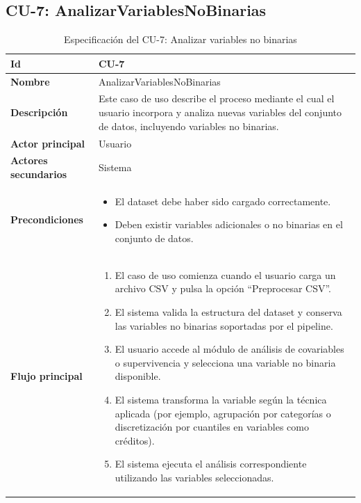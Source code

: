     \subsection{CU-7: AnalizarVariablesNoBinarias}
\begin{longtable}{|p{4cm}|p{10cm}|}
\caption{Especificación del CU-7: Analizar variables no binarias}
\label{tab:esp_cu7}\\
\hline
\textbf{Id} & CU-7 \\ \hline
\textbf{Nombre} & AnalizarVariablesNoBinarias \\ \hline

\textbf{Descripción} & 
Este caso de uso describe el proceso mediante el cual el usuario incorpora y analiza nuevas variables del conjunto de datos, incluyendo variables no binarias. \\ \hline

\textbf{Actor principal} & Usuario \\ \hline
\textbf{Actores secundarios} & Sistema \\ \hline

\textbf{Precondiciones} & 
\begin{itemize}
    \item El dataset debe haber sido cargado correctamente.
    \item Deben existir variables adicionales o no binarias en el conjunto de datos.
\end{itemize} \\ \hline

\textbf{Flujo principal} & 
\begin{enumerate}
    \item El caso de uso comienza cuando el usuario carga un archivo CSV y pulsa la opción ``Preprocesar CSV''.
    
    \item El sistema valida la estructura del dataset y conserva las variables no binarias soportadas por el pipeline.
    
    \item El usuario accede al módulo de análisis de covariables o supervivencia y selecciona una variable no binaria disponible.
    
    \item El sistema transforma la variable según la técnica aplicada (por ejemplo, agrupación por categorías o discretización por cuantiles en variables como créditos).
    
    \item El sistema ejecuta el análisis correspondiente utilizando las variables seleccionadas.
    

\end{enumerate}
\end{longtable}
